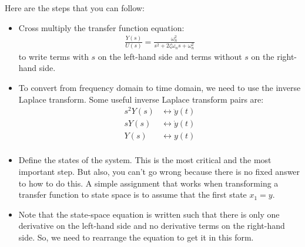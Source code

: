 \documentclass{ee122_notes}
\begin{document}
Here are the steps that you can follow:
\begin{itemize}
\item Cross multiply the transfer function equation: 
\begin{align*}
    \frac{Y(s)}{U(s)} = \frac{\omega_n^2}{s^2 + 2\zeta \omega_n s + \omega_n^2} 
\end{align*}
to write terms with $s$ on the left-hand side and terms without $s$ on the right-hand side. 
\item To convert from frequency domain to time domain, we need to use the inverse Laplace transform. Some useful inverse Laplace transform pairs are:
\begin{align*}
s^2 Y(s) &\leftrightarrow \ddot y(t) \\
s Y(s) &\leftrightarrow \dot y(t) \\
Y(s) &\leftrightarrow y(t) \\
\end{align*}
\item Define the states of the system. This is the most critical and the most important step. But also, you can't go wrong because there is no fixed answer to how to do this. A simple assignment that works when transforming a transfer function to state space is to assume that the first state $x_1 = y$. 
\item Note that the state-space equation is written such that there is only one derivative on the left-hand side and no derivative terms on the right-hand side. So, we need to rearrange the equation to get it in this form.
\end{itemize}
\end{document}
